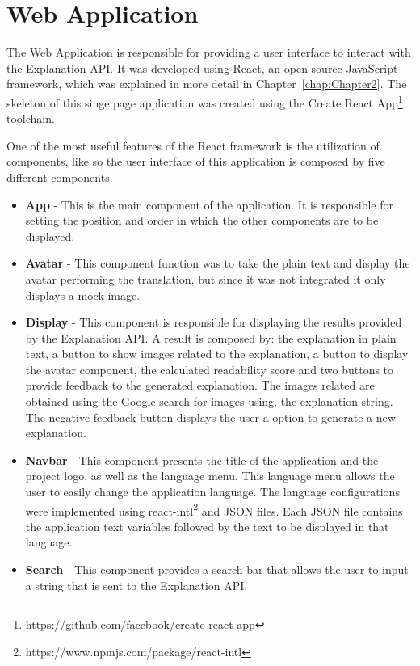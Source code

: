 \section{Web Application}

The Web Application is responsible for providing a user interface to interact with the Explanation API.
It was developed using React, an open source JavaScript framework, which was explained in more detail in Chapter~\ref{chap:Chapter2}.
The skeleton of this singe page application was created using the Create React App\footnote{https://github.com/facebook/create-react-app} toolchain.

One of the most useful features of the React framework is the utilization of components, like so the user interface of this application is composed by five different components.

\begin{itemize}
    \item \textbf{App} - This is the main component of the application.
        It is responsible for setting the position and order in which the other components are to be displayed.
    \item \textbf{Avatar} - This component function was to take the plain text and display the avatar performing the translation, but since it was not integrated it only displays a mock image.
    \item \textbf{Display} - This component is responsible for displaying the results provided by the Explanation API.
        A result is composed by: the explanation in plain text, a button to show images related to the explanation, a button to display the avatar component, the calculated readability score and two buttons to provide feedback to the generated explanation.
        The images related are obtained using the Google search for images using, the explanation string.
        The negative feedback button displays the user a option to generate a new explanation.
    \item \textbf{Navbar} - This component presents the title of the application and the project logo, as well as the language menu.
        This language menu allows the user to easily change the application language.
        The language configurations were implemented using react-intl\footnote{https://www.npmjs.com/package/react-intl} and JSON files.
        Each JSON file contains the application text variables followed by the text to be displayed in that language.
    \item \textbf{Search} - This component provides a search bar that allows the user to input a string that is sent to the Explanation API.
\end{itemize}


